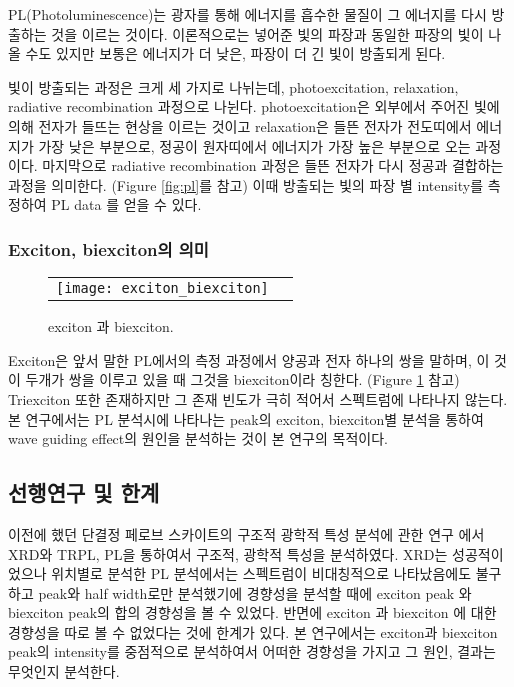PL(Photoluminescence)는 광자를 통해 에너지를 흡수한 물질이 그 에너지를 다시 방출하는 것을 이르는 것이다. 이론적으로는 넣어준 빛의 파장과 동일한 파장의 빛이 나올 수도 있지만 보통은 에너지가 더 낮은, 파장이 더 긴 빛이 방출되게 된다. 

빛이 방출되는 과정은 크게 세 가지로 나뉘는데, photoexcitation, relaxation, radiative recombination 과정으로 나뉜다. photoexcitation은 외부에서 주어진 빛에 의해 전자가 들뜨는 현상을 이르는 것이고 relaxation은 들뜬 전자가 전도띠에서 에너지가 가장 낮은 부분으로, 정공이 원자띠에서 에너지가 가장 높은 부분으로 오는 과정이다. 마지막으로 radiative recombination 과정은 들뜬 전자가 다시 정공과 결합하는 과정을 의미한다. (Figure \ref{fig:pl}를 참고) 이때 방출되는 빛의 파장 별 intensity를 측정하여 PL data 를 얻을 수 있다.

\subsubsection{Exciton, biexciton의 의미}
\begin{figure}[H]
	\begin{center}
		\begin{tabular}{cc}
			\texttt{[image: exciton\_biexciton]}
		\end{tabular}
	\end{center}
	\caption{exciton 과 biexciton.}
	\label{fig:ex}  
\end{figure}
Exciton은 앞서 말한 PL에서의 측정 과정에서 양공과 전자 하나의 쌍을 말하며, 이 것이 두개가 쌍을 이루고 있을 때 그것을 biexciton이라 칭한다. (Figure \ref{fig:ex} 참고) Triexciton 또한 존재하지만 그 존재 빈도가 극히 적어서 스펙트럼에 나타나지 않는다. 본 연구에서는 PL 분석시에 나타나는 peak의 exciton, biexciton별 분석을 통하여 wave guiding effect의 원인을 분석하는 것이 본 연구의 목적이다.

\subsection{선행연구 및 한계}
이전에 했던 단결정 페로브 스카이트의 구조적 광학적 특성 분석에 관한 연구 에서 XRD와 TRPL, PL을 통하여서 구조적, 광학적 특성을 분석하였다. XRD는 성공적이었으나 위치별로 분석한 PL 분석에서는 스펙트럼이 비대칭적으로 나타났음에도 불구하고 peak와 half width로만 분석했기에 경향성을 분석할 때에 exciton peak 와 biexciton peak의 합의 경향성을 볼 수 있었다. 반면에 exciton 과 biexciton 에 대한 경향성을 따로 볼 수 없었다는 것에 한계가 있다. 본 연구에서는 exciton과 biexciton peak의 intensity를 중점적으로 분석하여서 어떠한 경향성을 가지고 그 원인, 결과는 무엇인지 분석한다.

